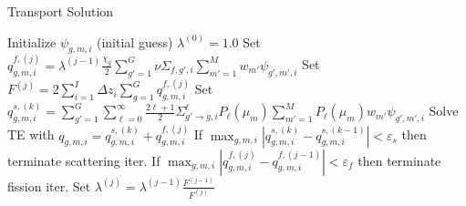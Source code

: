 \documentclass[11pt]{article}
\begin{document}
\begin{algorithm}
\caption{Transport Solution}
\label{alg::transportSolution}
\begin{algorithmic}[1]
  \State Initialize $\psi_{g,m,i}$ (initial guess)
  \State $\lambda^{(0)} = 1.0$
   
    \State Set $q_{g,m,i}^{f,(j)} = \lambda^{(j-1)}\frac{\chi_g}{2} \sum_{g'=1}^G \nu\Sigma_{f,g',i} \sum_{m'=1}^M w_{m'} \psi_{g',m',i}$
    \State Set $F^(j) = 2 \sum_{i=1}^I \Delta z _i \sum_{g=1}^G q_{g,m,i}^{f,(j)}$
     
      \State Set $q_{g,m,i}^{s,(k)} = \sum_{g'=1}^G \sum_{\ell=0}^\infty \frac{2\ell+1}{2} \Sigma_{g' \rightarrow g,i}^\ell P_\ell(\mu_m) \sum_{m'=1}^M P_\ell(\mu_m) w_{m'} \psi_{g',m',i}$
      \State Solve TE with $q_{g,m,i} = q_{g,m,i}^{s,(k)} + q_{g,m,i}^{f,(j)}$
      \State If $\max_{g,m,i} \left| q_{g,m,i}^{s,(k)} - q_{g,m,i}^{s,(k-1)} \right| < \varepsilon_s$ then terminate scattering iter.
    \EndFor
    \State If $\max_{g,m,i} \left| q_{g,m,i}^{f,(j)} - q_{g,m,i}^{f,(j-1)} \right| < \varepsilon_f$ then terminate fission iter.
    \State Set $\lambda^{(j)} = \lambda^{(j-1)} \frac{F^{(j-1)}}{F^{(j)}}$
  \EndFor
\end{algorithmic}
\end{algorithm}
\end{document}
